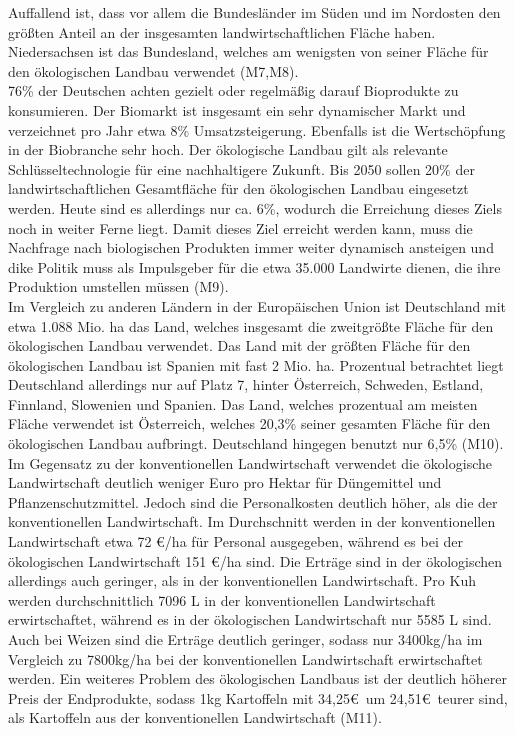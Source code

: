 \documentclass[12pt, a4paper]{report}
\begin{document}
	Auffallend ist, dass vor allem die Bundesländer im Süden und im Nordosten den größten Anteil an der insgesamten landwirtschaftlichen Fläche haben.
	Niedersachsen ist das Bundesland, welches am wenigsten von seiner Fläche für den ökologischen Landbau verwendet (M7,M8).
	\\
	76\% der Deutschen achten gezielt oder regelmäßig darauf Bioprodukte zu konsumieren. 
	Der Biomarkt ist insgesamt ein sehr dynamischer Markt und verzeichnet pro Jahr etwa 8\% Umsatzsteigerung. 
	Ebenfalls ist die Wertschöpfung in der Biobranche sehr hoch.
	Der ökologische Landbau gilt als relevante Schlüsseltechnologie für eine nachhaltigere Zukunft.
	Bis 2050 sollen 20\% der landwirtschaftlichen Gesamtfläche für den ökologischen Landbau eingesetzt werden.
	Heute sind es allerdings nur ca. 6\%, wodurch die Erreichung dieses Ziels noch in weiter Ferne liegt.
	Damit dieses Ziel erreicht werden kann, muss die Nachfrage nach biologischen Produkten immer weiter dynamisch ansteigen und dike Politik muss als Impulsgeber für die etwa 35.000 Landwirte dienen, die ihre Produktion umstellen müssen (M9).
	\\
	Im Vergleich zu anderen Ländern in der Europäischen Union ist Deutschland mit etwa 1.088 Mio. ha das Land, welches insgesamt die zweitgrößte Fläche für den ökologischen Landbau verwendet.
	Das Land mit der größten Fläche für den ökologischen Landbau ist Spanien mit fast 2 Mio. ha.
	Prozentual betrachtet liegt Deutschland allerdings nur auf Platz 7, hinter Österreich, Schweden, Estland, Finnland, Slowenien und Spanien.
	Das Land, welches prozentual am meisten Fläche verwendet ist Österreich, welches 20,3\% seiner gesamten Fläche für den ökologischen Landbau aufbringt.
	Deutschland hingegen benutzt nur 6,5\% (M10).
	\\
	Im Gegensatz zu der konventionellen Landwirtschaft verwendet die ökologische Landwirtschaft deutlich weniger Euro pro Hektar für Düngemittel und Pflanzenschutzmittel.
	Jedoch sind die Personalkosten deutlich höher, als die der konventionellen Landwirtschaft.
	Im Durchschnitt werden in der konventionellen Landwirtschaft etwa 72 \euro /ha für Personal ausgegeben, während es bei der ökologischen Landwirtschaft 151 \euro /ha sind.
	Die Erträge sind in der ökologischen allerdings auch geringer, als in der konventionellen Landwirtschaft.
	Pro Kuh werden durchschnittlich 7096 L in der konventionellen Landwirtschaft erwirtschaftet, während es in der ökologischen Landwirtschaft nur 5585 L sind.
	Auch bei Weizen sind die Erträge deutlich geringer,
	sodass nur 3400kg/ha im Vergleich zu 7800kg/ha bei der konventionellen Landwirtschaft erwirtschaftet werden.
	Ein weiteres Problem des ökologischen Landbaus ist der deutlich höherer Preis der Endprodukte, sodass 1kg Kartoffeln mit 34,25\euro\ um 24,51\euro\ teurer sind, als Kartoffeln aus der konventionellen Landwirtschaft (M11).
\end{document}
